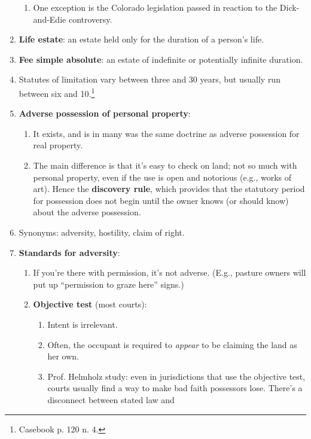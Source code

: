 \begin{enumerate}
\begin{enumerate}
        \item One exception is the Colorado legislation passed in reaction to 
        the Dick-and-Edie controversy.
    \end{enumerate}
    \item \textbf{Life estate}: an estate held only for the duration of a 
    person's life.
    \item \textbf{Fee simple absolute}: an estate of indefinite or potentially 
    infinite duration.
    \item Statutes of limitation vary between three and 30 years, but usually 
    run between six and 10.\footnote{Casebook p. 120 n. 4.}
    \item \textbf{Adverse possession of personal property}:
    \begin{enumerate}
        \item It exists, and is in many was the same doctrine as adverse 
        possession for real property.
        \item The main difference is that it's easy to check on 
        land; not so much with personal property, even if the use is open and 
        notorious (e.g., works of art). Hence the \textbf{discovery rule}, which 
        provides that the statutory period for possession does not begin until 
        the owner knows (or should know) about the adverse possession.
    \end{enumerate}
    \item Synonyms: adversity, hostility, claim of right.
    \item \textbf{Standards for adversity}:
    \begin{enumerate}
        \item If you're there with permission, it's not adverse. (E.g., 
        pasture owners will put up ``permission to graze here'' signs.)
        \item \textbf{Objective test} (most courts):
        \begin{enumerate}
            \item Intent is irrelevant.
            \item Often, the occupant is required to \emph{appear} to be 
            claiming the land as her own.
            \item Prof. Helmholz study: even in jurisdictions that use the 
            objective test, courts usually find a way to make bad faith 
            possessors lose. There's a disconnect between stated law and 

\end{enumerate}
\end{enumerate}
\end{enumerate}
